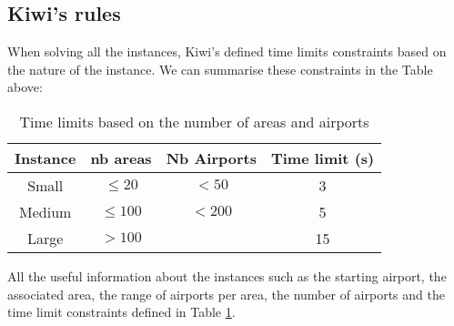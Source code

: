 \subsection{Kiwi's rules}
When solving all the instances, Kiwi's defined time limits constraints based on the nature of the instance. We can summarise these constraints in the Table above:
\begin{table}[!ht]
    \centering
    \begin{tabular}{||cccc||}
        \toprule
        Instance & nb areas   & Nb Airports & Time limit (s) \\ [1ex]
        \midrule
        Small    & $\leq 20$  & $<50$       & 3              \\
        Medium   & $\leq 100$ & $<200$      & 5              \\
        Large    & $>100$     &             & 15             \\ [1ex]
        \bottomrule
    \end{tabular}
    \caption{Time limits based on the number of areas and airports}
    \label{table:Time limit constraints}
\end{table}

All the useful information about the instances such as the starting airport, the associated area, the range of airports per area, the number of airports and the time limit constraints defined in  Table \ref{table:Time limit constraints}.

